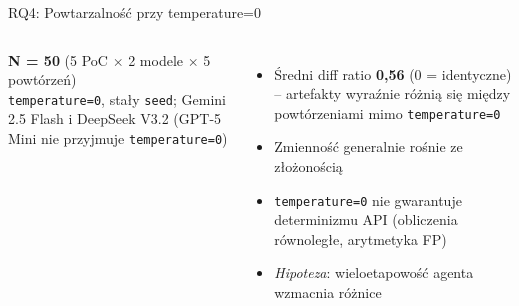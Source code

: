\documentclass[aspectratio=169]{beamer}
\begin{document}
\begin{frame}{RQ4: Powtarzalność przy temperature=0}
    \begin{columns}[T]

        \textbf{N = 50} (5 PoC $\times$ 2 modele $\times$ 5 powtórzeń)\\[0.2em]
        {\footnotesize \texttt{temperature=0}, stały \texttt{seed}; Gemini 2.5 Flash i DeepSeek V3.2 (GPT-5 Mini nie przyjmuje \texttt{temperature=0})}
        \vspace{0.3em}
        {\small
        \begin{itemize}
            \item Średni diff ratio \textbf{0,56} (0 = identyczne) -- artefakty wyraźnie różnią się między powtórzeniami mimo \texttt{temperature=0}
            \item Zmienność generalnie rośnie ze złożonością
            \item \texttt{temperature=0} nie gwarantuje determinizmu API (obliczenia równoległe, arytmetyka FP)
            \item \textit{Hipoteza}: wieloetapowość agenta wzmacnia różnice
        \end{itemize}}
    \end{columns}
\end{frame}
\end{document}

